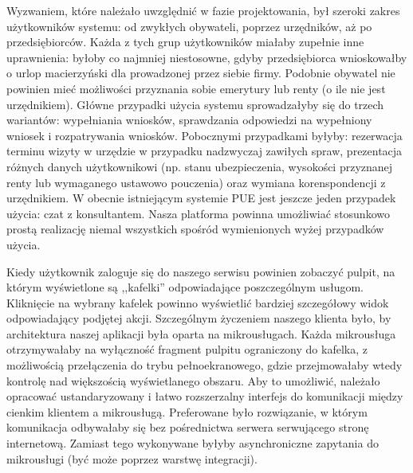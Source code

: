 \documentclass[licencjacka]{pracamgr}
\begin{document}
Wyzwaniem, które należało uwzględnić w fazie projektowania, był szeroki zakres użytkowników systemu: od zwykłych
obywateli, poprzez urzędników, aż po przedsiębiorców. Każda z tych grup użytkowników miałaby zupełnie inne uprawnienia:
byłoby co najmniej niestosowne, gdyby przedsiębiorca wnioskowałby o urlop macierzyński dla prowadzonej przez siebie
firmy. Podobnie obywatel nie powinien mieć możliwości przyznania sobie emerytury lub renty (o ile nie jest urzędnikiem). Główne przypadki użycia systemu sprowadzałyby się do trzech wariantów: wypełniania wniosków, sprawdzania
odpowiedzi na wypełniony wniosek i rozpatrywania wniosków. Pobocznymi przypadkami byłyby: rezerwacja terminu wizyty w
urzędzie w przypadku nadzwyczaj zawiłych spraw, prezentacja różnych danych użytkownikowi (np. stanu ubezpieczenia,
wysokości przyznanej renty lub wymaganego ustawowo pouczenia) oraz wymiana korenspondencji z urzędnikiem. W obecnie
istniejącym systemie PUE jest jeszcze jeden przypadek użycia: czat z konsultantem. Nasza platforma powinna umożliwiać
stosunkowo prostą realizację niemal wszystkich spośród wymienionych wyżej przypadków użycia.

Kiedy użytkownik zaloguje się do naszego serwisu powinien zobaczyć pulpit, na którym wyświetlone są ,,kafelki''
odpowiadające poszczególnym usługom. Kliknięcie na wybrany kafelek powinno wyświetlić bardziej szczegółowy widok
odpowiadający podjętej akcji. Szczególnym życzeniem naszego klienta było, by architektura naszej aplikacji była
oparta na mikrousługach. Każda mikrousługa otrzymywałaby na wyłączność fragment pulpitu ograniczony do kafelka,
z możliwością przełączenia do trybu pełnoekranowego, gdzie przejmowałaby wtedy kontrolę nad większością wyświetlanego
obszaru. Aby to umożliwić, należało opracować ustandaryzowany i łatwo rozszerzalny interfejs do komunikacji między
cienkim klientem a mikrousługą. Preferowane było rozwiązanie, w którym komunikacja odbywałaby się bez pośrednictwa
serwera serwującego stronę internetową. Zamiast tego wykonywane byłyby asynchroniczne zapytania do mikrousługi (być
może poprzez warstwę integracji).
\end{document}
